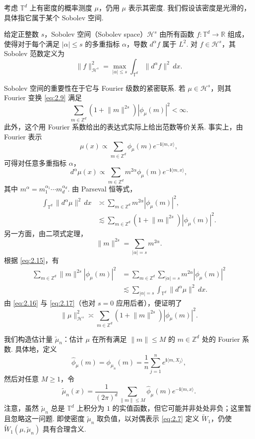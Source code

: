 考虑 $\mathbb T^d$ 上有密度的概率测度 $\mu$，仍用 $\mu$ 表示其密度. 我们假设该密度是光滑的，具体指它属于某个 Sobolev 空间.
\begin{definition}\label{def:2.16}
给定正整数 $s$，Sobolev 空间（Sobolev space）$\mathcal H^s$ 由所有函数 $f:\mathbb T^d\to\mathbb R$ 组成，使得对于每个满足 $|\alpha|\le s$ 的多重指标 $\alpha$，导数 $d^\alpha f$ 属于 $L^2$. 对 $f\in\mathcal H^s$，其 Sobolev 范数定义为
$$\lVert f\rVert_{\mathcal H^s}^2=\max_{|\alpha|\le s}\int_{\mathbb T^d}\lVert d^\alpha f\rVert^2\,dx.$$
\end{definition}
Sobolev 空间的重要性在于它与 Fourier 级数的紧密联系. 若 $\mu\in\mathcal H^s$，则其 Fourier 变换 \eqref{eq:2.9} 满足
$$\sum_{m\in\mathbb Z^d}(1+\lVert m\rVert^{2s})|\phi_\mu(m)|^2<\infty.$$
此外，这个用 Fourier 系数给出的表达式实际上给出范数等价关系. 事实上，由 Fourier 表示
$$\mu(x)\propto\sum_{m\in\mathbb Z^d}\phi_\mu(m)e^{-\mathbf i\langle m,x\rangle},$$
可得对任意多重指标 $\alpha$，
$$d^\alpha\mu(x)\propto\sum_{m\in\mathbb Z^d}m^{2\alpha}\phi_\mu(m)e^{-\mathbf i\langle m,x\rangle},$$
其中 $m^\alpha=m_1^{\alpha_1}\cdots m_d^{\alpha_d}$. 由 Parseval 恒等式，
\begin{align}
\int_{\mathbb T^d}\lVert d^\alpha\mu\rVert^2\,dx
&\asymp\sum_{m\in\mathbb Z^d}m^{2\alpha}|\phi_\mu(m)|^2,\label{eq:2.15}\\
&\lesssim\sum_{m\in\mathbb Z^d}(1+\lVert m\rVert^{2s})|\phi_\mu(m)|^2.\label{eq:2.16}
\end{align}
另一方面，由二项式定理，
$$\lVert m\rVert^{2s}=\sum_{|\alpha|=s}m^{2\alpha}.$$
根据 \eqref{eq:2.15}，有
\begin{equation}\label{eq:2.17}
\begin{aligned}
\sum_{m\in\mathbb Z^d}\lVert m\rVert^{2s}|\phi_\mu(m)|^2
&=\sum_{m\in\mathbb Z^d}\sum_{|\alpha|=s}m^{2\alpha}|\phi_\mu(m)|^2\\
&\lesssim\sum_{|\alpha|=s}\int_{\mathbb T^d}\lVert d^\alpha\mu\rVert^2\,dx.
\end{aligned}
\end{equation}
由 \eqref{eq:2.16} 与 \eqref{eq:2.17}（也对 $s=0$ 应用后者），便证明了
$$\lVert\mu\rVert_{\mathcal H^s}^2\asymp\sum_{m\in\mathbb Z^d}(1+\lVert m\rVert^{2s})|\phi_\mu(m)|^2.$$

我们构造估计量 $\tilde\mu_n$：估计 $\mu$ 在所有满足 $\lVert m\rVert\le M$ 的 $m\in\mathbb Z^d$ 处的 Fourier 系数. 具体地，定义
$$\widehat\phi_\mu(m)=\phi_{\mu_n}(m)=\frac1n\sum_{j=1}^n e^{\mathbf i\langle m,X_j\rangle},$$
然后对任意 $M\ge1$，令
$$\tilde\mu_n(x)=\frac1{(2\pi)^d}\sum_{\lVert m\rVert\le M}\widehat\phi_\mu(m)e^{-\mathbf i\langle m,x\rangle}.$$
注意，虽然 $\tilde\mu_n$ 总是 $\mathbb T^d$ 上积分为 $1$ 的实值函数，但它可能并非处处非负；这里暂且忽略这一问题. 即使密度 $\tilde\mu_n$ 取负值，以对偶表示 \eqref{eq:2.7} 定义 $\widetilde W_1$，仍使 $\widetilde W_1(\mu,\tilde\mu_n)$ 具有合理含义.

